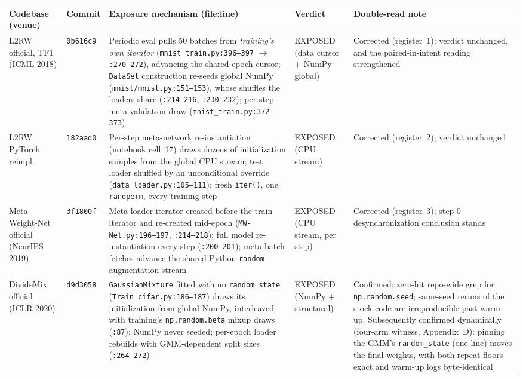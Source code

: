 \documentclass[10pt,letterpaper]{article}
\theoremstyle{remark}
\newcommand{\code}[1]{\texttt{#1}}
\begin{document}
\begin{table}[tbp]
\centering
\footnotesize
\setlength{\tabcolsep}{4pt}
\begin{tabular}{@{}L{2.5cm}L{1.15cm}L{5.95cm}L{1.9cm}L{3.5cm}@{}}
\toprule
Codebase (venue) & Commit & Exposure mechanism (file:line) & Verdict &
Double-read note \\
\midrule
L2RW official, TF1 (ICML 2018) & \code{0b616c9} &
Periodic eval pulls 50 batches from \emph{training's own iterator}
(\code{mnist\_train.py:396--397} $\to$ \code{:270--272}), advancing the
shared epoch cursor; \code{DataSet} construction re-seeds global NumPy
(\code{mnist/mnist.py:151--153}), whose shuffles the loaders share
(\code{:214--216}, \code{:230--232}); per-step meta-validation draw
(\code{mnist\_train.py:372--373}) &
EXPOSED (data cursor $+$ NumPy global) &
Corrected (register~1); verdict unchanged, and the
paired-in-intent reading strengthened \\
\addlinespace
L2RW PyTorch reimpl. & \code{182aad0} &
Per-step meta-network re-instantiation (notebook cell~17) draws dozens of
initialization samples from the global CPU stream; test loader shuffled by
an unconditional override (\code{data\_loader.py:105--111}); fresh
\code{iter()}, one \code{randperm}, every training step &
EXPOSED (CPU stream) &
Corrected (register~2); verdict unchanged \\
\addlinespace
Meta-Weight-Net official (NeurIPS 2019) & \code{3f1800f} &
Meta-loader iterator created before the train iterator and re-created
mid-epoch (\code{MW-Net.py:196--197}, \code{:214--218}); full model
re-instantiation every step (\code{:200--201}); meta-batch fetches advance
the shared Python-\code{random} augmentation stream &
EXPOSED (CPU stream, per step) &
Corrected (register~3); step-0 desynchronization conclusion stands \\
\addlinespace
DivideMix official (ICLR 2020) & \code{d9d3058} &
\code{GaussianMixture} fitted with no \code{random\_state}
(\code{Train\_cifar.py:186--187}) draws its initialization from global
NumPy, interleaved with training's \code{np.random.beta} mixup draws
(\code{:87}); NumPy never seeded; per-epoch loader rebuilds with
GMM-dependent split sizes (\code{:264--272}) &
EXPOSED (NumPy $+$ structural) &
Confirmed; zero-hit repo-wide grep for \code{np.random.seed}; same-seed
reruns of the stock code are irreproducible past warm-up. Subsequently
confirmed dynamically (four-arm witness, Appendix~D): pinning the GMM's
\code{random\_state} (one line) moves the final weights, with both
repeat floors exact and warm-up logs byte-identical \\

\end{tabular}
\end{table}
\end{document}
